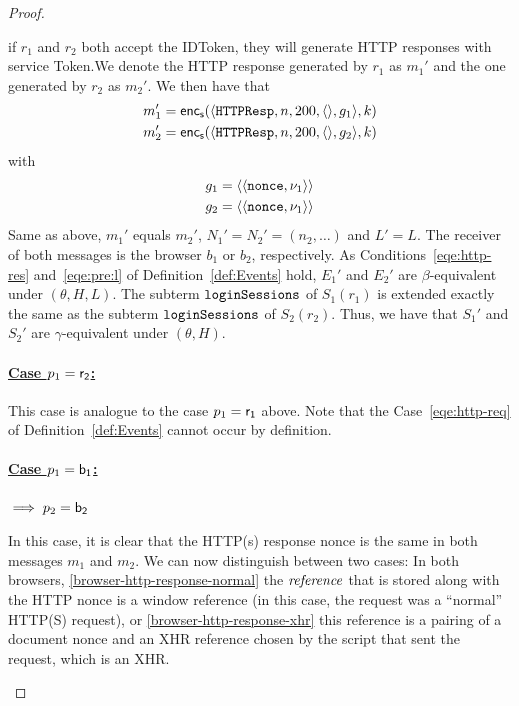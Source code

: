\begin{proof}
\begin{itemize}
        if $r_1$ and $r_2$ both accept the IDToken, they will 
        generate HTTP responses with service Token.We denote 
        the HTTP response generated by $r_1$ as $m_1'$ and the
        one generated by $r_2$ as $m_2'$. We then have that
        \begin{align*}
          m_1' = \mathsf{enc}_\mathsf{s}(\langle\mathtt{HTTPResp},n,200,\langle\rangle,g_1\rangle,k) \\
          m_2' = \mathsf{enc}_\mathsf{s}(\langle\mathtt{HTTPResp},n,200,\langle\rangle,g_2\rangle,k)
        \end{align*}
        with
        \begin{align*}
          g_1 = \langle\langle\mathtt{nonce}, \nu_1\rangle\rangle \\
          g_2 = \langle\langle\mathtt{nonce}, \nu_1\rangle\rangle
        \end{align*}
        Same as above, $m_1'$ equals $m_2'$, $N_1' = N_2' = 
        (n_2, \dots)$ and $L' = L$. 
        The receiver of both messages is the browser $b_1$ or 
        $b_2$, respectively. As Conditions~\ref{eqe:http-res} 
        and~\ref{eqe:pre:l} of Definition~\ref{def:Events} hold, 
        $E_1'$ and $E_2'$ are $\beta$-equivalent under 
        $(\theta,H,L)$. The subterm $\mathtt{loginSessions}$ of 
        $S_1(r_1)$ is extended exactly the same as the subterm 
        $\mathtt{loginSessions}$ of $S_2(r_2)$. Thus, we have that 
        $S_1'$ and $S_2'$ are $\gamma$-equivalent under 
        $(\theta,H)$.
    \end{itemize}
  
    \paragraph{\underline{Case $p_1 = \mathsf{r_2}$:}} This case is
    analogue to the case $p_1 = \mathsf{r_1}$ above. Note that the
    Case~\ref{eqe:http-req} of Definition~\ref{def:Events} 
    cannot occur by definition.
  
    \paragraph{\underline{Case $p_1 = \mathsf{b_1}$:}} 
    $\implies p_2 = \mathsf{b_2}$ 
  
  
    \begin{description}
      \newc
      \item[HTTP response]\label{proof:http-response} In this case, it is clear that
        the HTTP(s) response nonce is the same in both
        messages $m_1$ and $m_2$. 
        We can now distinguish between two cases: 
        In both browsers, \ref{browser-http-response-normal}
        the $\mathit{reference}$ that is stored along with the HTTP 
        nonce is a window reference (in this case, the request 
        was a ``normal'' HTTP(S) request), 
        or \ref{browser-http-response-xhr} this reference is a 
        pairing of a document nonce and an XHR reference chosen 
        by the script that sent the request, which is an XHR.
        

\end{description}
\end{proof}
